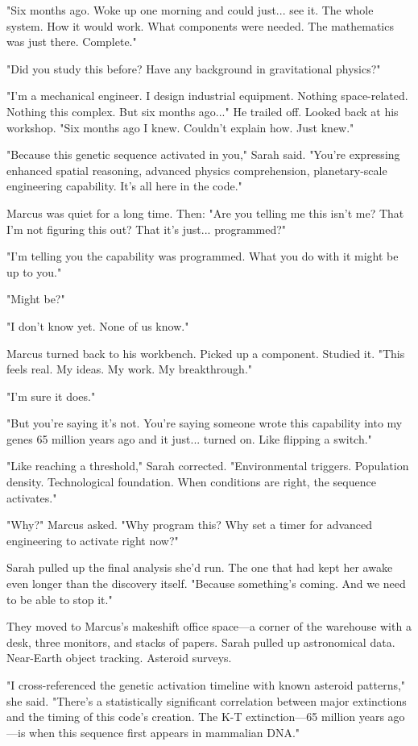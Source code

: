 "Six months ago. Woke up one morning and could just... see it. The whole system. How it would work. What components were needed. The mathematics was just there. Complete."

"Did you study this before? Have any background in gravitational physics?"

"I'm a mechanical engineer. I design industrial equipment. Nothing space-related. Nothing this complex. But six months ago..." He trailed off. Looked back at his workshop. "Six months ago I knew. Couldn't explain how. Just knew."

"Because this genetic sequence activated in you," Sarah said. "You're expressing enhanced spatial reasoning, advanced physics comprehension, planetary-scale engineering capability. It's all here in the code."

Marcus was quiet for a long time. Then: "Are you telling me this isn't me? That I'm not figuring this out? That it's just... programmed?"

"I'm telling you the capability was programmed. What you do with it might be up to you."

"Might be?"

"I don't know yet. None of us know."

Marcus turned back to his workbench. Picked up a component. Studied it. "This feels real. My ideas. My work. My breakthrough."

"I'm sure it does."

"But you're saying it's not. You're saying someone wrote this capability into my genes 65 million years ago and it just... turned on. Like flipping a switch."

"Like reaching a threshold," Sarah corrected. "Environmental triggers. Population density. Technological foundation. When conditions are right, the sequence activates."

"Why?" Marcus asked. "Why program this? Why set a timer for advanced engineering to activate right now?"

Sarah pulled up the final analysis she'd run. The one that had kept her awake even longer than the discovery itself. "Because something's coming. And we need to be able to stop it."

\scenebreak

They moved to Marcus's makeshift office space—a corner of the warehouse with a desk, three monitors, and stacks of papers. Sarah pulled up astronomical data. Near-Earth object tracking. Asteroid surveys.

"I cross-referenced the genetic activation timeline with known asteroid patterns," she said. "There's a statistically significant correlation between major extinctions and the timing of this code's creation. The K-T extinction—65 million years ago—is when this sequence first appears in mammalian DNA."

